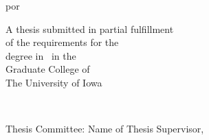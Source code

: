 \maketitle

\thispagestyle{empty}
\longvertspacing{}
\begin{tightcenter}
  por
\end{tightcenter}
\mylinespacing{}
\begin{tightcenter}
  \myname{}
\end{tightcenter}
\longvertspacing{}
\begin{tightcenter}
  A thesis submitted in partial fulfillment \\
  of the requirements for the \degreetype\\
  degree in \myprogram~in the  \\
  Graduate College of \\
  The University of Iowa
\end{tightcenter}
\mylinespacing{}
\begin{tightcenter}
  \mymonth~\myyear{}
\end{tightcenter}
\mylinespacing{}
\begin{tightcenter}
  Thesis Committee: Name of Thesis Supervisor, \myadvisor{}
\end{tightcenter}
\begin{tightcenter}
  \committeememberA{}
\end{tightcenter}
